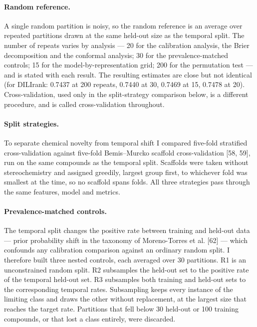 \documentclass[pdflatex,sn-basic,Numbered,referee,lineno]{sn-jnl}%
\theoremstyle{thmstyleone}%
\theoremstyle{thmstyletwo}%
\theoremstyle{thmstylethree}%
\begin{document}
\paragraph{Random reference.}
A single random partition is noisy, so the random reference is an average over repeated partitions drawn at the same held-out size as the temporal split. The number of repeats varies by analysis --- 20 for the calibration analysis, the Brier decomposition and the conformal analysis; 30 for the prevalence-matched controls; 15 for the model-by-representation grid; 200 for the permutation test --- and is stated with each result. The resulting estimates are close but not identical (for DILIrank: 0.7437 at 200 repeats, 0.7440 at 30, 0.7469 at 15, 0.7478 at 20). Cross-validation, used only in the split-strategy comparison below, is a different procedure, and is called cross-validation throughout.

\paragraph{Split strategies.}
To separate chemical novelty from temporal shift I compared five-fold stratified cross-validation against five-fold Bemis--Murcko scaffold cross-validation [58, 59], run on the same compounds as the temporal split. Scaffolds were taken without stereochemistry and assigned greedily, largest group first, to whichever fold was smallest at the time, so no scaffold spans folds. All three strategies pass through the same features, model and metrics.

\paragraph{Prevalence-matched controls.}
The temporal split changes the positive rate between training and held-out data --- prior probability shift in the taxonomy of Moreno-Torres et al. [62] --- which confounds any calibration comparison against an ordinary random split. I therefore built three nested controls, each averaged over 30 partitions. R1 is an unconstrained random split. R2 subsamples the held-out set to the positive rate of the temporal held-out set. R3 subsamples both training and held-out sets to the corresponding temporal rates. Subsampling keeps every instance of the limiting class and draws the other without replacement, at the largest size that reaches the target rate. Partitions that fell below 30 held-out or 100 training compounds, or that lost a class entirely, were discarded.
\end{document}

